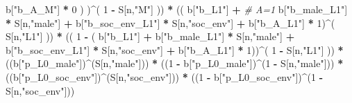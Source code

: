 \documentclass[
]{book}
\newenvironment{Shaded}{\begin{snugshade}}{\end{snugshade}}
\newcommand{\CommentTok}[1]{\textcolor[rgb]{0.56,0.35,0.01}{\textit{#1}}}
\newcommand{\DecValTok}[1]{\textcolor[rgb]{0.00,0.00,0.81}{#1}}
\newcommand{\NormalTok}[1]{#1}
\newcommand{\SpecialCharTok}[1]{\textcolor[rgb]{0.81,0.36,0.00}{\textbf{#1}}}
\newcommand{\StringTok}[1]{\textcolor[rgb]{0.31,0.60,0.02}{#1}}
\begin{document}
\begin{Shaded}
\begin{Highlighting}[]
\NormalTok{                b[}\StringTok{"b\_A\_M"}\NormalTok{] }\SpecialCharTok{*} \DecValTok{0}\NormalTok{ ) )}\SpecialCharTok{\^{}}\NormalTok{( }\DecValTok{1} \SpecialCharTok{{-}}\NormalTok{ S[n,}\StringTok{"M"}\NormalTok{] )) }\SpecialCharTok{*}
\NormalTok{      (( b[}\StringTok{"b\_L1"}\NormalTok{] }\SpecialCharTok{+}                                                            \CommentTok{\# A=1}
\NormalTok{           b[}\StringTok{"b\_male\_L1"}\NormalTok{] }\SpecialCharTok{*}\NormalTok{ S[n,}\StringTok{"male"}\NormalTok{] }\SpecialCharTok{+}  
\NormalTok{           b[}\StringTok{"b\_soc\_env\_L1"}\NormalTok{] }\SpecialCharTok{*}\NormalTok{ S[n,}\StringTok{"soc\_env"}\NormalTok{] }\SpecialCharTok{+}
\NormalTok{           b[}\StringTok{"b\_A\_L1"}\NormalTok{] }\SpecialCharTok{*} \DecValTok{1}\NormalTok{)}\SpecialCharTok{\^{}}\NormalTok{( S[n,}\StringTok{"L1"}\NormalTok{] )) }\SpecialCharTok{*}
\NormalTok{      (( }\DecValTok{1} \SpecialCharTok{{-}}\NormalTok{ ( b[}\StringTok{"b\_L1"}\NormalTok{] }\SpecialCharTok{+}
\NormalTok{                 b[}\StringTok{"b\_male\_L1"}\NormalTok{] }\SpecialCharTok{*}\NormalTok{ S[n,}\StringTok{"male"}\NormalTok{] }\SpecialCharTok{+}  
\NormalTok{                 b[}\StringTok{"b\_soc\_env\_L1"}\NormalTok{] }\SpecialCharTok{*}\NormalTok{ S[n,}\StringTok{"soc\_env"}\NormalTok{] }\SpecialCharTok{+}
\NormalTok{                 b[}\StringTok{"b\_A\_L1"}\NormalTok{] }\SpecialCharTok{*} \DecValTok{1}\NormalTok{))}\SpecialCharTok{\^{}}\NormalTok{( }\DecValTok{1} \SpecialCharTok{{-}}\NormalTok{ S[n,}\StringTok{"L1"}\NormalTok{] )) }\SpecialCharTok{*}
\NormalTok{      ((b[}\StringTok{"p\_L0\_male"}\NormalTok{])}\SpecialCharTok{\^{}}\NormalTok{(S[n,}\StringTok{"male"}\NormalTok{])) }\SpecialCharTok{*} 
\NormalTok{      ((}\DecValTok{1} \SpecialCharTok{{-}}\NormalTok{ b[}\StringTok{"p\_L0\_male"}\NormalTok{])}\SpecialCharTok{\^{}}\NormalTok{(}\DecValTok{1} \SpecialCharTok{{-}}\NormalTok{ S[n,}\StringTok{"male"}\NormalTok{])) }\SpecialCharTok{*} 
\NormalTok{      ((b[}\StringTok{"p\_L0\_soc\_env"}\NormalTok{])}\SpecialCharTok{\^{}}\NormalTok{(S[n,}\StringTok{"soc\_env"}\NormalTok{])) }\SpecialCharTok{*}
\NormalTok{      ((}\DecValTok{1} \SpecialCharTok{{-}}\NormalTok{ b[}\StringTok{"p\_L0\_soc\_env"}\NormalTok{])}\SpecialCharTok{\^{}}\NormalTok{(}\DecValTok{1} \SpecialCharTok{{-}}\NormalTok{ S[n,}\StringTok{"soc\_env"}\NormalTok{])) }
    

\end{Highlighting}
\end{Shaded}
\end{document}
